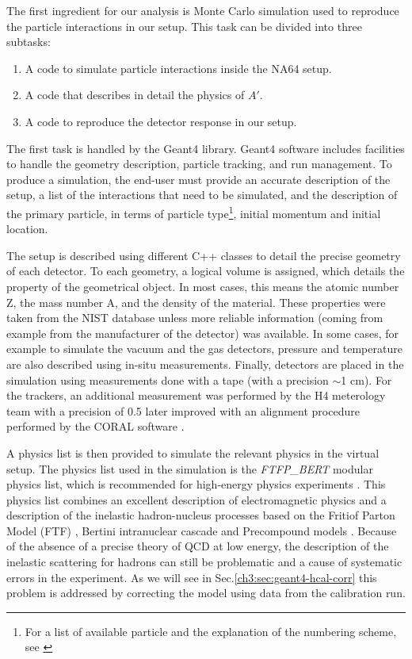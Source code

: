 The first ingredient for our analysis is Monte Carlo simulation used to reproduce the particle interactions in our setup. This task can be divided into three subtasks:

\begin{enumerate}
\item A code to simulate particle interactions inside the NA64 setup.
\item A code that describes in detail the physics of $A'$.  
\item A code to reproduce the detector response in our setup.  
\end{enumerate}

The first task is handled by the Geant4 library\cite{AGOSTINELLI2003250}. Geant4 software includes facilities to handle the geometry description, particle tracking, and run management. To produce a simulation, the end-user must provide an accurate description of the setup, a list of the interactions that need to be simulated, and the description of the primary particle, in terms of particle type\footnote{For a list of available particle and the explanation of the numbering scheme, see \cite{geant4-pdg}}, initial momentum and initial location.

The setup is described using different C++ classes to detail the precise geometry of each detector. To each geometry, a logical volume is assigned, which details the property of the geometrical object. In most cases, this means the atomic number Z, the mass number A, and the density of the material. These properties were taken from the NIST database \cite{nist-database} unless more reliable information (coming from example from the manufacturer of the detector) was available. In some cases, for example to simulate the vacuum and the gas detectors, pressure and temperature are also described using in-situ measurements. Finally, detectors are placed in the simulation using measurements done with a tape (with a precision $\sim$1 \si{\centi\meter}). For the trackers, an additional measurement was performed by the H4 meterology team with a precision of 0.5 \mmi \cite{meterology-measurements} later improved with an alignment procedure performed by the CORAL software \cite{ABBON2007455}. 

A physics list is then provided to simulate the relevant physics in the virtual setup. The physics list used in the simulation is the \textit{\textrm{FTFP\_BERT}} modular physics list, which is recommended for high-energy physics experiments \cite{ALLISON2016186}. This physics list combines an excellent description of electromagnetic physics and a description of the inelastic hadron-nucleus processes based on the Fritiof Parton Model (FTF) \cite{Uzhinsky:2013hea}, Bertini intranuclear cascade \cite{Heikkinen:2003sc} and Precompound models \cite{Apostolakis:2009zz}. Because of the absence of a precise theory of QCD at low energy, the description of the inelastic scattering for hadrons can still be problematic and a cause of systematic errors in the experiment. As we will see in Sec.\ref{ch3:sec:geant4-hcal-corr} this problem is addressed by correcting the model using data from the calibration run. 

